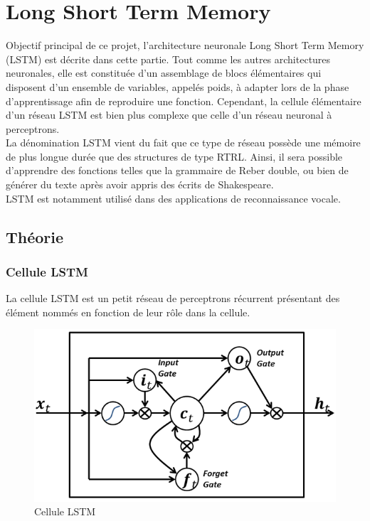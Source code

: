 
\chapter{Long Short Term Memory}

Objectif principal de ce projet, l'architecture neuronale Long Short Term Memory
(LSTM) est décrite dans cette partie. Tout comme les autres architectures
neuronales, elle est constituée d'un assemblage de blocs élémentaires qui
disposent d'un ensemble de variables, appelés poids, à adapter lors de la phase
d'apprentissage afin de reproduire une fonction. Cependant, la cellule
élémentaire d'un réseau LSTM est bien plus complexe que celle d'un réseau
neuronal à perceptrons. \\

La dénomination LSTM vient du fait que ce type de réseau possède une mémoire de
plus longue durée que des structures de type RTRL. Ainsi, il sera possible
d'apprendre des fonctions telles que la grammaire de Reber double, ou bien de
générer du texte après avoir appris des écrits de Shakespeare. \\
LSTM est notamment utilisé dans des applications de reconnaissance vocale.

\section{Théorie}
\subsection{Cellule LSTM}
La cellule LSTM est un petit réseau de perceptrons récurrent présentant des
élément nommés en fonction de leur rôle dans la cellule.

\begin{figure}[!ht]
\begin{center}
\includegraphics[scale=0.8]{images/lstm.png}
\end{center}
\caption{Cellule LSTM}
\end{figure}

